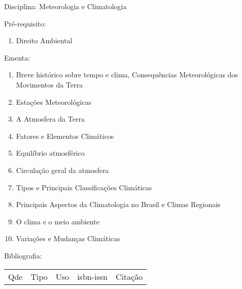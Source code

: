 \documentclass[12pt,a4paper,twoside]{report}
\begin{document}
Disciplina: Meteorologia e Climatologia

Pré-requisito:
\begin{enumerate}
\item Direito Ambiental
\end{enumerate}

Ementa:
\begin{enumerate}
\item Breve histórico sobre tempo e clima, Consequências Meteorológicas dos Movimentos da Terra
\item Estações Meteorológicas
\item A Atmosfera da Terra
\item Fatores e Elementos Climáticos
\item Equilíbrio atmosférico
\item Circulação geral da atmosfera
\item Tipos e Principais Classificações Climáticas
\item Principais Aspectos da Climatologia no Brasil e Climas Regionais
\item O clima e o meio ambiente
\item Variações e Mudanças Climáticas
\end{enumerate}

Bibliografia:
\begin{tabular}{lllll}
Qde & Tipo & Uso & isbn-issn & Citação \\
\end{tabular}
\end{document}
